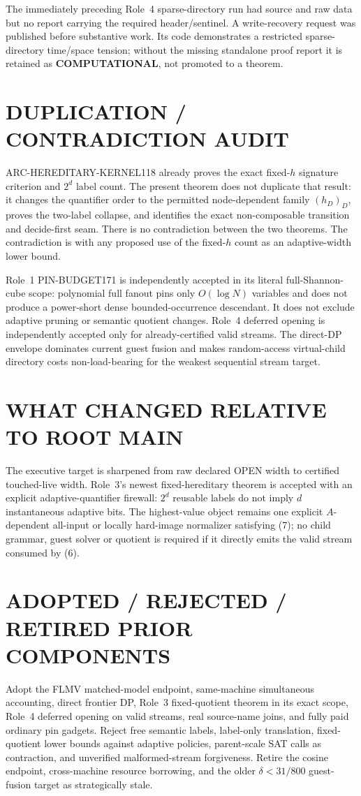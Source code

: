 \documentclass[11pt]{article}
\begin{document}
The immediately preceding Role~4 sparse-directory run had source and raw
data but no report carrying the required header/sentinel.  A write-recovery
request was published before substantive work.  Its code demonstrates a
restricted sparse-directory time/space tension; without the missing
standalone proof report it is retained as \textbf{COMPUTATIONAL}, not
promoted to a theorem.

\section{DUPLICATION / CONTRADICTION AUDIT}
ARC-HEREDITARY-KERNEL118 already proves the exact fixed-$h$ signature
criterion and $2^d$ label count.  The present theorem does not duplicate
that result: it changes the quantifier order to the permitted node-dependent
family $(h_D)_D$, proves the two-label collapse, and identifies the exact
non-composable transition and decide-first seam.  There is no contradiction
between the two theorems.  The contradiction is with any proposed use of
the fixed-$h$ count as an adaptive-width lower bound.

Role~1 PIN-BUDGET171 is independently accepted in its literal full-Shannon-
cube scope: polynomial full fanout pins only $O(\log N)$ variables and does
not produce a power-short dense bounded-occurrence descendant.  It does not
exclude adaptive pruning or semantic quotient changes.  Role~4 deferred
opening is independently accepted only for already-certified valid streams.
The direct-DP envelope dominates current guest fusion and makes random-access
virtual-child directory costs non-load-bearing for the weakest sequential
stream target.

\section{WHAT CHANGED RELATIVE TO ROOT MAIN}
The executive target is sharpened from raw declared OPEN width to certified
touched-live width.  Role~3's newest fixed-hereditary theorem is accepted
with an explicit adaptive-quantifier firewall: $2^d$ reusable labels do not
imply $d$ instantaneous adaptive bits.  The highest-value object remains one
explicit $A$-dependent all-input or locally hard-image normalizer satisfying
(7); no child grammar, guest solver or quotient is required if it directly
emits the valid stream consumed by (6).

\section{ADOPTED / REJECTED / RETIRED PRIOR COMPONENTS}
Adopt the FLMV matched-model endpoint, same-machine simultaneous accounting,
direct frontier DP, Role~3 fixed-quotient theorem in its exact scope, Role~4
deferred opening on valid streams, real source-name joins, and fully paid
ordinary pin gadgets.  Reject free semantic labels, label-only translation,
fixed-quotient lower bounds against adaptive policies, parent-scale SAT calls
as contraction, and unverified malformed-stream forgiveness.  Retire the
cosine endpoint, cross-machine resource borrowing, and the older
$\delta<31/800$ guest-fusion target as strategically stale.
\end{document}
